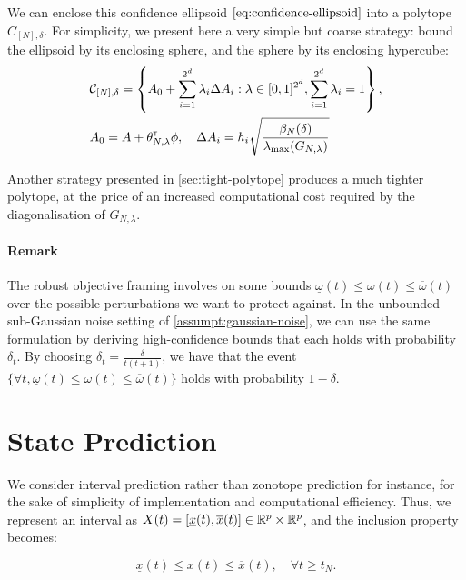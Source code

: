 \documentclass{article}
\begin{document}
We can enclose this confidence ellipsoid $\eqref{eq:confidence-ellipsoid}$ into a polytope $C_{[N],\delta}$. For simplicity, we present here a very simple but coarse strategy: bound the ellipsoid by its enclosing sphere, and the sphere by its enclosing hypercube:
\begin{align}
    \label{eq:polytope}
     &\mathcal{C}_{[N],\delta} = \left\{ A_{0}+\sum_{i=1}^{2^d}\lambda_{i}\Delta A_{i}: \lambda\in[0, 1]^{2^d},  \sum_{i=1}^{2^d}\lambda_{i}=1\right\},\\
     &A_0 = A + \theta_{N,\lambda}^{\mathsf{\scriptscriptstyle T}}\phi, \quad\Delta A_{i} = h_i \sqrt{\frac{\beta_N(\delta)}{\lambda_{\max}(G_{N,\lambda})}}
\end{align}

Another strategy presented in \autoref{sec:tight-polytope} produces a much tighter polytope, at the price of an increased computational cost required by the diagonalisation of $G_{N,\lambda}$.

\paragraph{Remark} The robust objective framing involves on some bounds $\underline{\omega}(t)\leq \omega(t) \leq \overline{\omega}(t)$ over the possible perturbations we want to protect against. In the unbounded sub-Gaussian noise setting of \autoref{assumpt:gaussian-noise}, we can use the same formulation by deriving high-confidence bounds that each holds with probability $\delta_t$. By choosing $\delta_t = \frac{\delta}{t(t+1)}$, we have that the event $\{\forall t, \underline{\omega}(t) \leq \omega(t) \leq \overline{\omega}(t)\}$ holds with probability $1-\delta$.

\section{State Prediction}

\label{sec:prediction}

We consider interval prediction rather than zonotope prediction for instance, for the sake of simplicity of implementation and computational efficiency. Thus, we represent an interval as $X(t) = [\underline{x}(t), \overline{x}(t)]\in \mathbb{R}^p\times \mathbb{R}^p$, and the inclusion property becomes:

\begin{equation}
\label{eq:inclusion-property}
\underline{x}(t)\leq x(t)\leq\overline{x}(t),\quad\forall t\geq t_N.
\end{equation} 
\end{document}
